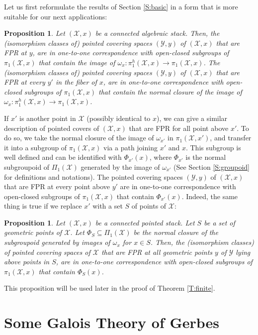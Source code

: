 \documentclass{amsart}
\newtheorem{prop}[thm]{Proposition}
\theoremstyle{definition}
\theoremstyle{remark}
\theoremstyle{remark}
\newcommand{\X}{\mathcal{X}}
\newcommand{\Y}{\mathcal{Y}}
\newcommand{\ox}{\omega_x}
\newcommand{\PX}{\Pi_1(\X)}
\newcommand{\pX}{\pi_1(\X,x)}
\newcommand{\phX}{\pi_1^{h}(\X,x)}
\let\:=\colon
\begin{document}
Let us first reformulate the results of Section \ref{S:basic} in a
form that is more suitable for our next applications:

\begin{prop}{\label{P:a}}
Let $(\X,x)$ be a connected algebraic stack. Then, the
(isomorphism classes of) pointed covering spaces $(\Y,y)$ of
$(\X,x)$ that are FPR at $y$, are in one-to-one correspondence
with open-closed subgroups of $\pX$ that contain the image of $\ox
\: \phX \to \pX$. The (isomorphism classes of) pointed covering
spaces $(\Y,y)$ of $(\X,x)$ that are FPR at every $y'$ in the
fiber of $x$, are in one-to-one correspondence with  open-closed
subgroups of $\pX$ that contain the  normal closure of the image
of $\ox \: \phX \to \pX$.
\end{prop}

If $x'$ is another point in $\X$ (possibly identical to $x$), we
can give a similar description of pointed covers of $(\X,x)$ that
are FPR for all point above $x'$. To do so, we take the normal
closure of the image of $\omega_{x'}$ in $\pi_1(\X,x')$, and
transfer it into a subgroup  of $\pX$ via a path joining $x'$ and
$x$. This subgroup is well defined and can be identified with
$\Phi_{x'}(x)$, where $\Phi_{x'}$ is the normal subgroupoid  of
$\PX$ generated by the image of $\omega_{x'}$ (See Section
\ref{S:groupoid} for definitions and notations). The pointed
covering spaces $(\Y,y)$ of $(\X,x)$ that are FPR at every point
above $y'$ are in one-to-one correspondence with open-closed
subgroups of $\pX$ that contain $\Phi_{x'}(x)$. Indeed, the same
thing is true if we replace $x'$ with a set $S$ of points of $\X$:

\begin{prop}{\label{P:b}}
Let $(\X,x)$ be a connected pointed stack. Let $S$ be a set of
geometric points of $\X$. Let $\Phi_S \subseteq \PX$ be the normal
closure of the subgroupoid generated by images of $\ox$ for $x \in
S$. Then, the (isomorphism classes) of pointed covering spaces of
$\X$  that are FPR at all geometric points $y$ of $\Y$ lying above
points in $S$, are in one-to-one correspondence with open-closed
subgroups of $\pX$ that contain  $\Phi_S(x)$.
\end{prop}

This proposition will be used later in the proof of Theorem
\ref{T:finite}.
\section{Some Galois Theory of Gerbes}{\label{S:gerbes}}
\end{document}
